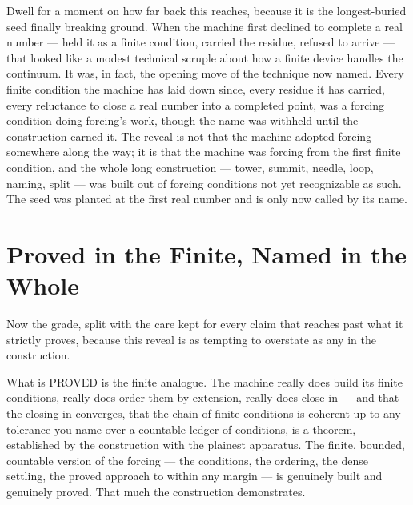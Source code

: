 Dwell for a moment on how far back this reaches, because it is the longest-buried seed finally
breaking ground. When the machine first declined to complete a real number --- held it as a finite condition,
carried the residue, refused to arrive --- that looked like a modest technical scruple about how a finite device
handles the continuum. It was, in fact, the opening move of the technique now named. Every finite
condition the machine has laid down since, every residue it has carried, every reluctance to close a real number
into a completed point, was a forcing condition doing forcing's work, though the name was withheld until the
construction earned it. The reveal is not that the machine adopted forcing somewhere along the way; it is that the
machine was forcing from the first finite condition, and the whole long construction --- tower, summit, needle,
loop, naming, split --- was built out of forcing conditions not yet recognizable as such. The seed was planted at
the first real number and is only now called by its name.

\section{Proved in the Finite, Named in the Whole}

Now the grade, split with the care kept for every claim that reaches past what it strictly proves,
because this reveal is as tempting to overstate as any in the construction.

What is PROVED is the finite analogue. The machine really does build its finite conditions, really does order them
by extension, really does close in --- and that the closing-in converges, that the chain of finite conditions is
coherent up to any tolerance you name over a countable ledger of conditions, is a theorem, established by the
construction with the plainest apparatus. The finite, bounded, countable version of the forcing --- the
conditions, the ordering, the dense settling, the proved approach to within any margin --- is genuinely built and
genuinely proved. That much the construction demonstrates.

